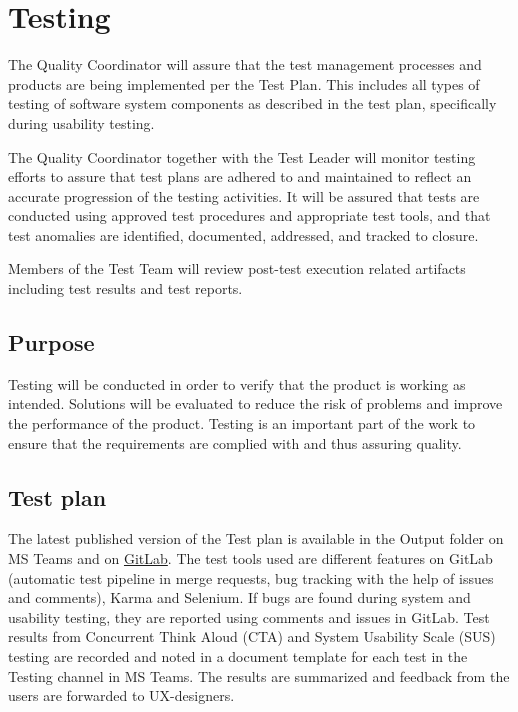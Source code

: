 \section{Testing}
\label{sec:testing}

The Quality Coordinator will assure that the test management processes and products are being implemented per the Test Plan. This includes all types of testing of software system components as described in the test plan, specifically during usability testing.

The Quality Coordinator together with the Test Leader will monitor testing efforts to assure that test plans are adhered to and maintained to reflect an accurate progression of the testing activities. It will be assured that tests are conducted using approved test procedures and appropriate test tools, and that test anomalies are identified, documented, addressed, and tracked to closure.

Members of the Test Team will review post-test execution related artifacts including test results and test reports.

\subsection{Purpose}
Testing will be conducted in order to verify that the product is working as intended. Solutions will be evaluated to reduce the risk of problems and improve the performance of the product. Testing is an important part of the work to ensure that the requirements are complied with and thus assuring quality.

\subsection{Test plan}
The latest published version of the Test plan is available in the Output folder on MS Teams and on \href{https://gitlab.liu.se/tddc88-company-1-2021/deploy/-/tree/develop/documents/Test\%20Plan}{GitLab}. The test tools used are different features on GitLab (automatic test pipeline in merge requests, bug tracking with the help of issues and comments), Karma and Selenium. If bugs are found during system and usability testing, they are reported using comments and issues in GitLab. Test results from Concurrent Think Aloud (CTA) and System Usability Scale (SUS) testing are recorded and noted in a document template for each test in the Testing channel in MS Teams. The results are summarized and feedback from the users are forwarded to UX-designers.  

